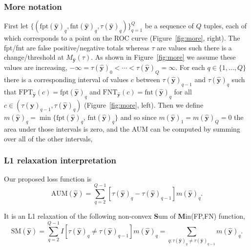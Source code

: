 \documentclass{beamer}
\begin{document}
\begin{frame}
  \frametitle{More notation}
  First let $\{(
\text{fpt}
(\mathbf {\hat y})
_q, \text{fnt}
(\mathbf {\hat y})
_q,
 \tau
(\mathbf {\hat y})
_q
)\}_{q=1}^Q$ 
be a sequence of $Q$ tuples, each of which corresponds to a point on the ROC curve (Figure~\ref{fig:more}, right).
The fpt/fnt are false positive/negative totals whereas $\tau$ are values such there is a change/threshold at $M_{\mathbf{\hat y}}(\tau)$. 
As shown in Figure~\ref{fig:more} we assume these values are increasing, $ -\infty = \tau
(\mathbf {\hat y})
_0 < \cdots <  \tau
(\mathbf {\hat y})
_Q = \infty$.
For each $q\in\{1,\dots,Q\}$ there is a corresponding interval of values $c$ between $\tau(\mathbf {\hat y})_{q-1}$ and $\tau(\mathbf {\hat y})_q$
such that 
$\text{FPT}_{\mathbf{\hat y}}(c)=\text{fpt}(\mathbf {\hat y})_q$
and
$\text{FNT}_{\mathbf{\hat y}}(c)=\text{fnt}(\mathbf {\hat y})_q$
for all $c\in(\tau(\mathbf {\hat y})_{q-1}, \tau(\mathbf {\hat y})_q)$
(Figure~\ref{fig:more}, left).
Then we define $m(\mathbf {\hat y})_q = \min\{
    \text{fpt}(\mathbf {\hat y})_q , \, 
    \text{fnt}(\mathbf {\hat y})_q
\}$ and so since 
$m(\mathbf {\hat y})_1=m(\mathbf {\hat y})_Q=0$ the area under those intervals is zero, and the AUM can be computed by summing over all of the other intervals,
\end{frame}

\begin{frame}
  \frametitle{L1 relaxation interpretation}
  
Our proposed loss function is
\begin{equation*}
\label{eq:AUM-computation}
    \text{AUM}(\mathbf {\hat y}) =
    \sum_{q=2}^{Q-1}
    [ \tau(\mathbf {\hat y})_{q} - \tau(\mathbf {\hat y})_{q-1} ]
    m(\mathbf {\hat y})_q.
\end{equation*}

It is an L1 relaxation of the following non-convex \textbf{S}um of \textbf{M}in(FP,FN) function, 
\begin{equation*}
\label{eq:SM-computation}
    \text{SM}(\mathbf {\hat y}) =
    \sum_{q=2}^{Q-1}
    I[ \tau(\mathbf {\hat y})_{q} \neq \tau(\mathbf {\hat y})_{q-1} ]
    m(\mathbf {\hat y})_q =
    \sum_{q:\tau(\mathbf {\hat y})_{q} \neq \tau(\mathbf {\hat y})_{q-1} }
    m(\mathbf {\hat y})_q.
\end{equation*}

\end{frame}
\end{document}
